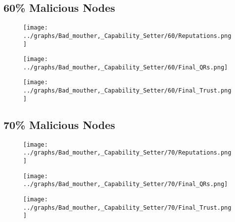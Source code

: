 \documentclass{article}
\begin{document}
  \begin{minipage}[t]{0.49\columnwidth}
    \subsection*{60\% Malicious Nodes}
        \begin{figure}[H]
            \centering
            \texttt{[image: ../graphs/Bad\_mouther,\_Capability\_Setter/60/Reputations.png]}
        \end{figure}
        \begin{figure}[H]
            \centering
            \texttt{[image: ../graphs/Bad\_mouther,\_Capability\_Setter/60/Final\_QRs.png]}
        \end{figure}
    \end{minipage}
    \begin{minipage}[t]{0.49\columnwidth}
        \begin{figure}[H]
            \centering
            \texttt{[image: ../graphs/Bad\_mouther,\_Capability\_Setter/60/Final\_Trust.png]}
        \end{figure}
    \end{minipage}

  \begin{minipage}[t]{0.49\columnwidth}
    \subsection*{70\% Malicious Nodes}
        \begin{figure}[H]
            \centering
            \texttt{[image: ../graphs/Bad\_mouther,\_Capability\_Setter/70/Reputations.png]}
        \end{figure}
        \begin{figure}[H]
            \centering
            \texttt{[image: ../graphs/Bad\_mouther,\_Capability\_Setter/70/Final\_QRs.png]}
        \end{figure}
    \end{minipage}
    \begin{minipage}[t]{0.49\columnwidth}
        \begin{figure}[H]
            \centering
            \texttt{[image: ../graphs/Bad\_mouther,\_Capability\_Setter/70/Final\_Trust.png]}
        \end{figure}
    \end{minipage}
\end{document}
